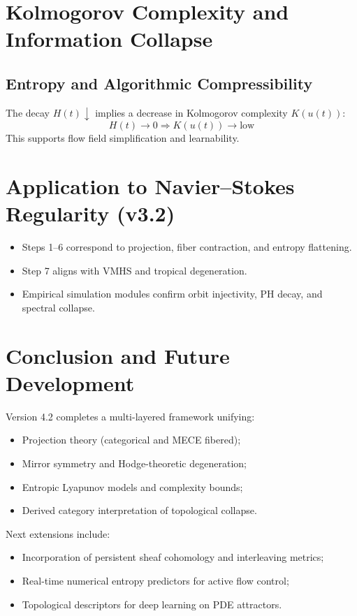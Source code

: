\documentclass[11pt]{article}
\theoremstyle{remark}
\begin{document}
\section{Kolmogorov Complexity and Information Collapse}

\subsection{Entropy and Algorithmic Compressibility}
The decay $H(t) \downarrow$ implies a decrease in Kolmogorov complexity $K(u(t))$:
\[
H(t) \to 0 \Rightarrow K(u(t)) \to \text{low}
\]
This supports flow field simplification and learnability.

\section{Application to Navier–Stokes Regularity (v3.2)}
\begin{itemize}
    \item Steps 1–6 correspond to projection, fiber contraction, and entropy flattening.
    \item Step 7 aligns with VMHS and tropical degeneration.
    \item Empirical simulation modules confirm orbit injectivity, PH decay, and spectral collapse.
\end{itemize}

\section{Conclusion and Future Development}
Version 4.2 completes a multi-layered framework unifying:
\begin{itemize}
    \item Projection theory (categorical and MECE fibered);
    \item Mirror symmetry and Hodge-theoretic degeneration;
    \item Entropic Lyapunov models and complexity bounds;
    \item Derived category interpretation of topological collapse.
\end{itemize}
Next extensions include:
\begin{itemize}
    \item Incorporation of persistent sheaf cohomology and interleaving metrics;
    \item Real-time numerical entropy predictors for active flow control;
    \item Topological descriptors for deep learning on PDE attractors.
\end{itemize}
\end{document}

